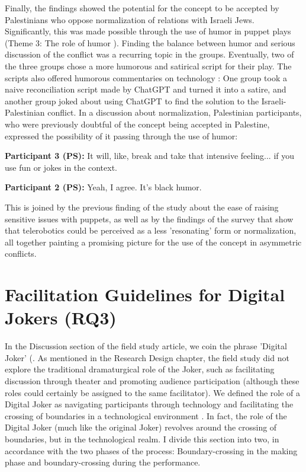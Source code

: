 \documentclass[dissertation,math,vertlayout,pdfa,colorlinks]{aaltoseries}
\begin{document}
Finally, the findings showed the potential for the concept to be accepted by Palestinians who oppose normalization of relations with Israeli Jews. Significantly, this was made possible through the use of humor in puppet plays (Theme 3: The role of humor \cite[p. 17]{peledTeleroboticTheaterOppressed2025}). Finding the balance between humor and serious discussion of the conflict was a recurring topic in the groups. Eventually, two of the three groups chose a more humorous and satirical script for their play. The scripts also offered humorous commentaries on technology \cite[p. 12]{peledTeleroboticTheaterOppressed2025}: One group took a naive reconciliation script made by ChatGPT and turned it into a satire, and another group joked about using ChatGPT to find the solution to the Israeli-Palestinian conflict. In a discussion about normalization, Palestinian participants, who were previously doubtful of the concept being accepted in Palestine, expressed the possibility of it passing through the use of humor:
\begin{displayquote}
\textbf{Participant 3 (PS):} It will, like, break and take that intensive feeling... if you use fun or jokes in the context. 

\textbf{Participant 2 (PS):} Yeah, I agree. It's black humor.
\end{displayquote}
This is joined by the previous finding of the study about the ease of raising sensitive issues with puppets, as well as by the findings of the survey that show that telerobotics could be perceived as a less 'resonating' form or normalization, all together painting a promising picture for the use of the concept in asymmetric conflicts.


\section{Facilitation Guidelines for Digital Jokers (RQ3)}
In the Discussion section of the field study article, we coin the phrase 'Digital Joker' (\cite[p. 19]{peledTeleroboticTheaterOppressed2025}. As mentioned in the Research Design chapter, the field study did not explore the traditional dramaturgical role of the Joker, such as facilitating discussion through theater and promoting audience participation (although these roles could certainly be assigned to the same facilitator). We defined the role of a Digital Joker as navigating participants through technology and facilitating the crossing of boundaries in a technological environment \cite[p. 19]{peledTeleroboticTheaterOppressed2025}. In fact, the role of the Digital Joker (much like the original Joker) revolves around the crossing of boundaries, but in the technological realm. I divide this section into two, in accordance with the two phases of the process: Boundary-crossing in the making phase and boundary-crossing during the performance.
\end{document}
